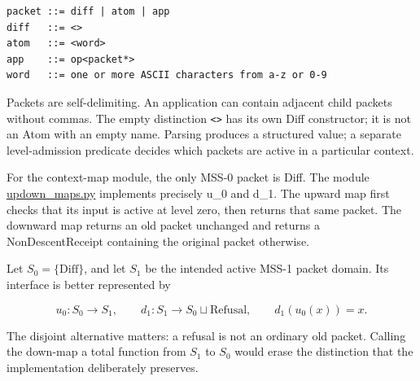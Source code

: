\documentclass[
  11pt,
]{article}
\newcommand{\passthrough}[1]{#1}
\begin{document}
\begin{lstlisting}
packet ::= diff | atom | app
diff   ::= <>
atom   ::= <word>
app    ::= op<packet*>
word   ::= one or more ASCII characters from a-z or 0-9
\end{lstlisting}

Packets are self-delimiting. An application can contain adjacent child
packets without commas. The empty distinction
\passthrough{\lstinline!<>!} has its own Diff constructor; it is not an
Atom with an empty name. Parsing produces a structured value; a separate
level-admission predicate decides which packets are active in a
particular context.

For the context-map module, the only MSS-0 packet is Diff. The module
\href{https://github.com/dbccpage/the_symbol_game/blob/main/omega_engine_education/documentation/030_pfp_proposal_fidelity_protocol_pfp/papers/omega_engine_symbol_game/008_pfp_mssn_tower_challenges_and_retraction_benchmarks/docs/source_archive/mss0_mss1_52cb5457/updown_maps.py}{updown\_maps.py}
implements precisely u\_0 and d\_1. The upward map first checks that its
input is active at level zero, then returns that same packet. The
downward map returns an old packet unchanged and returns a
NonDescentReceipt containing the original packet otherwise.

Let \(S_0=\{\mathrm{Diff}\}\), and let \(S_1\) be the intended active
MSS-1 packet domain. Its interface is better represented by

\[
u_0:S_0\longrightarrow S_1,\qquad
d_1:S_1\longrightarrow S_0\sqcup\mathrm{Refusal},
\qquad d_1(u_0(x))=x.
\]

The disjoint alternative matters: a refusal is not an ordinary old
packet. Calling the down-map a total function from \(S_1\) to \(S_0\)
would erase the distinction that the implementation deliberately
preserves.
\end{document}
